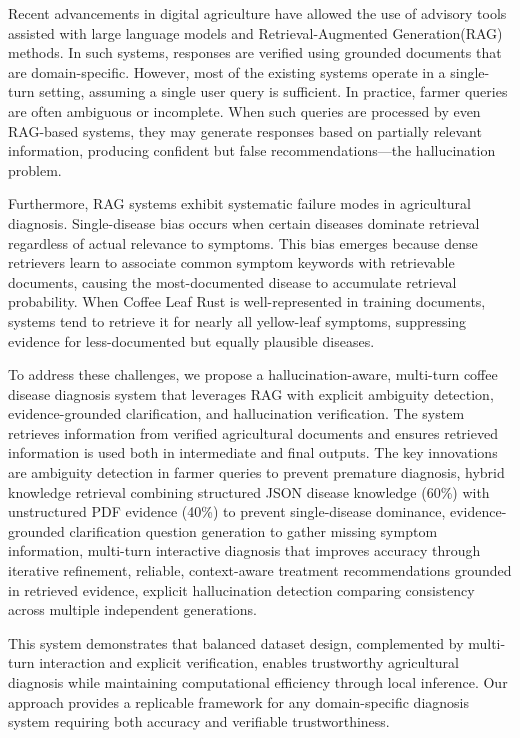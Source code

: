 \documentclass[conference]{IEEEtran}
\begin{document}
Recent advancements in digital agriculture have allowed the use of advisory tools assisted with large language models and Retrieval-Augmented Generation(RAG) methods. In such systems, responses are verified using grounded documents that are domain-specific. However, most of the existing systems operate in a single-turn setting, assuming a single user query is sufficient. In practice, farmer queries are often ambiguous or incomplete. When such queries are processed by even RAG-based systems, they may generate responses based on partially relevant information, producing confident but false recommendations---the hallucination problem.

Furthermore, RAG systems exhibit systematic failure modes in agricultural diagnosis. Single-disease bias occurs when certain diseases dominate retrieval regardless of actual relevance to symptoms. This bias emerges because dense retrievers learn to associate common symptom keywords with retrievable documents, causing the most-documented disease to accumulate retrieval probability. When Coffee Leaf Rust is well-represented in training documents, systems tend to retrieve it for nearly all yellow-leaf symptoms, suppressing evidence for less-documented but equally plausible diseases.

To address these challenges, we propose a hallucination-aware, multi-turn coffee disease diagnosis system that leverages RAG with explicit ambiguity detection, evidence-grounded clarification, and hallucination verification. The system retrieves information from verified agricultural documents and ensures retrieved information is used both in intermediate and final outputs. The key innovations are ambiguity detection in farmer queries to prevent premature diagnosis, hybrid knowledge retrieval combining structured JSON disease knowledge (60\%) with unstructured PDF evidence (40\%) to prevent single-disease dominance, evidence-grounded clarification question generation to gather missing symptom information, multi-turn interactive diagnosis that improves accuracy through iterative refinement, reliable, context-aware treatment recommendations grounded in retrieved evidence, explicit hallucination detection comparing consistency across multiple independent generations.

This system demonstrates that balanced dataset design, complemented by multi-turn interaction and explicit verification, enables trustworthy agricultural diagnosis while maintaining computational efficiency through local inference. Our approach provides a replicable framework for any domain-specific diagnosis system requiring both accuracy and verifiable trustworthiness.
\end{document}
